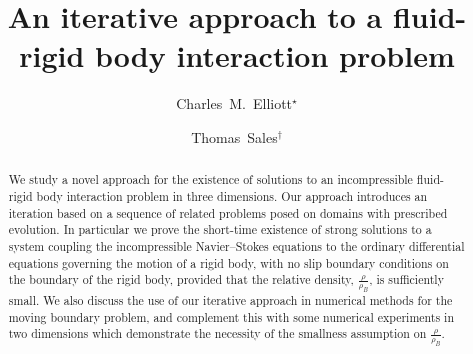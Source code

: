 \documentclass[a4paper]{amsart}
\title[An iterative approach to a fluid-rigid body interaction problem]{An iterative approach to a fluid-rigid body interaction problem}
\author[C.~M.~Elliott]{Charles~M.~Elliott$^\star$}
\author[T.~Sales]{Thomas~Sales$^\dagger$}
\numberwithin{equation}{section}
\theoremstyle{plain}
\begin{document}
\begin{abstract}
	We study a novel approach for the existence of solutions to an incompressible fluid-rigid body interaction problem in three dimensions.
    Our approach introduces an iteration based on a sequence of related problems posed on domains with prescribed evolution.
	In particular we prove the short-time existence of strong solutions to a system coupling the incompressible Navier--Stokes equations to the ordinary differential equations governing the motion of a rigid body, with no slip boundary conditions on the boundary of the rigid body, provided that the relative density, $\frac{\rho}{\rho_B}$, is sufficiently small.
    We also discuss the use of our iterative approach in numerical methods for the moving boundary problem, and complement this with some numerical experiments in two dimensions which demonstrate the necessity of the smallness assumption on $\frac{\rho}{\rho_B}$.
\end{abstract}

\maketitle
\end{document}
